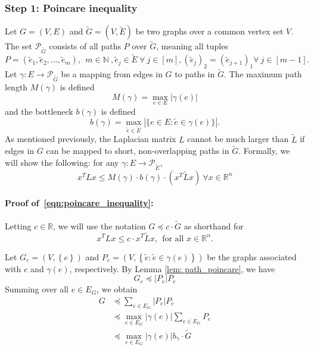 \documentclass{article}
\newcommand{\Reals}{\mathbb{R}}
\newcommand{\abs}[1]{\left \lvert #1 \right \rvert}
\newcommand{\set}[1]{\left\{#1\right\}}
\newcommand{\1}{\mathbf{1}}
\newcommand{\wt}[1]{\widetilde{#1}}
\theoremstyle{alden}
\theoremstyle{aldenthm}
\theoremstyle{definition}
\theoremstyle{remark}
\begin{document}
\subsubsection{Step 1: Poincare inequality}

Let $G = (V,E)$ and $\wt{G} = (V,\wt{E})$ be two graphs over a common vertex set $V$. The set $\mathcal{P}_{\wt{G}}$ consists of all paths $P$ over $\wt{G}$, meaning all tuples
\begin{equation*}
P = (\wt{e}_1,\wt{e}_2,\ldots,\wt{e}_m),~~m \in \mathbb{N}~, \wt{e}_j \in \wt{E}~ \forall~ j \in [m], (\wt{e}_j)_2 = (\wt{e}_{j + 1})_1 \forall~j \in [m - 1].
\end{equation*}
Let $\gamma:E \to \mathcal{P}_{\wt{G}}$ be a mapping from edges in $G$ to paths in $\wt{G}$. The maximum path length $M(\gamma)$ is defined
\begin{equation*}
M(\gamma) = \max_{e \in E} \abs{\gamma(e)}
\end{equation*} 
and the bottleneck $b(\gamma)$ is defined
\begin{equation*}
b(\gamma) = \max_{\wt{e} \in \wt{E}} \abs{\{e \in E:  \wt{e} \in \gamma(e)\}}.
\end{equation*}
As mentioned previously, the Laplacian matrix $L$ cannot be much larger than $\wt{L}$ if edges in $G$ can be mapped to short, non-overlapping paths in $\wt{G}$. Formally, we will show the following: for any $\gamma: E \to \mathcal{P}_{\wt{E}}$,
\begin{equation}
\label{eqn:poincare_inequality}
x^T L x \leq M(\gamma)\cdot b(\gamma) \cdot (x^T \wt{L} x)~\forall{x \in \Reals^n}
\end{equation} 

\paragraph{Proof of~\eqref{eqn:poincare_inequality}:}

Letting $c \in \Reals$, we will use the notation $G \preceq c \cdot  \wt{G}$ as shorthand for
\begin{equation*}
x^T L x \leq c \cdot  x^T \wt{L} x,~~\textrm{for all $x \in \Reals^n$}.
\end{equation*}


Let $G_e = (V, \set{e})$ and $P_e = (V, \set{\widetilde{e}: \widetilde{e} \in \gamma(e)})$ be the graphs associated with $e$ and $\gamma(e)$, respectively. By Lemma \ref{lem: path_poincare}, we have
\begin{equation*}
G_{e} \preceq \abs{P_e} P_e
\end{equation*}
Summing over all $e \in E_G$, we obtain
\begin{align*}
G & \preceq \sum_{e \in E_G} \abs{P_e} P_e \\
& \preceq \max_{e \in E_G} \abs{\gamma(e)} \sum_{e \in E_G} P_e \\
& \preceq \max_{e \in E_G} \abs{\gamma(e)} b_{\gamma}\cdot \widetilde{G}
\end{align*}
\end{document}
